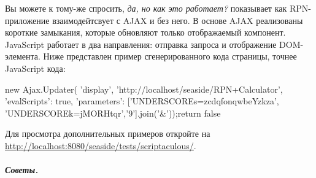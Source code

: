\documentclass[a4paper,10pt,twoside]{book}
\begin{document}



Вы можете к тому-же спросить, \emph{да, но как это работает?}
 показывает как RPN-приложение взаимодейтсвует с
AJAX и без него. В основе AJAX реализованы короткие замыкания, которые
обновляют только отображаемый компонент. JavaScript работает в два
направления: отправка запроса и отображение DOM-элемента. Ниже
представлен пример сгенерированного кода страницы, точнее JavaScript кода:

\begin{code}{}
new Ajax.Updater(
	'display',
	'http://localhost/seaside/RPN+Calculator',
	{'evalScripts': true,
'parameters': ['UNDERSCOREs=zcdqfonqwbeYzkza',
'UNDERSCOREk=jMORHtqr','9'].join('&')});return false
\end{code}


Для просмотра дополнительных примеров откройте на
\url{http://localhost:8080/seaside/tests/scriptaculous/}.

\paragraph{\emph{Советы.}}
\end{document}
